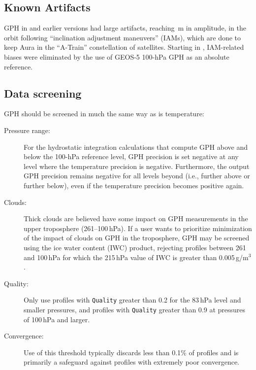 \subsection{Known Artifacts}
GPH in \prevv and earlier versions had large artifacts, reaching \,m in amplitude, in the orbit following ``inclination adjustment maneuvers'' (IAMs), which are done to keep Aura in the ``A-Train'' constellation of satellites. Starting in \prevv, IAM-related biases were eliminated by the use of \mbox{GEOS-5} \mbox{100-hPa} GPH as an absolute reference. 

\begin{nofloatpages}
\subsection{Data screening}
\label{sec:GPHScreening}
GPH should be screened in much the same way as is temperature:
\begin{description}
  \item[Pressure range:]  \standardrangestatement

    \standardprecisionrule{} For the hydrostatic integration calculations that compute GPH above and below the \mbox{100-hPa} reference level, GPH precision is set negative at any level where the temperature precision is negative.  Furthermore, the output GPH precision remains negative for all levels beyond (i.e., further above or further below), even if the temperature precision becomes positive again.

    \evenstatusrule

  \item[Clouds:] Thick clouds are believed have some impact on \thisv GPH measurements in the upper troposphere (261--100\,hPa). If a user wants to prioritize minimization of the impact of clouds on GPH in the troposphere, GPH may be screened using the ice water content (IWC) product, rejecting profiles between 261 and 100\,hPa for which the 215\,hPa value of IWC is greater than 0.005\,g/m$^3$.

  \item[Quality:] Only use profiles with \texttt{Quality} greater than 0.2 for the 83\,hPa level and smaller pressures, and profiles with \texttt{Quality} greater than 0.9 at pressures of 100\,hPa and larger.

  \item[Convergence:]  Use of this threshold typically discards less than 0.1\% of profiles and is primarily a safeguard against profiles with extremely poor convergence.

\end{description}
\end{nofloatpages}

